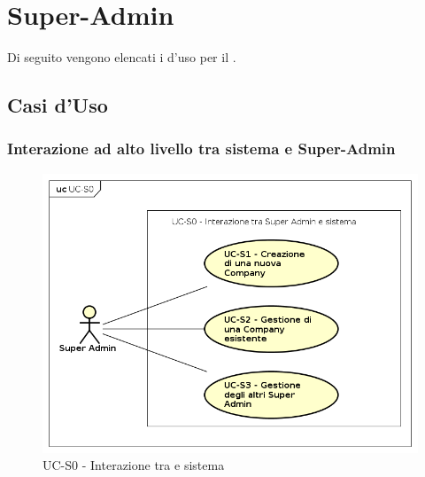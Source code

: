 \section{Super-Admin}

Di seguito vengono elencati i  d'uso per il .


\subsection{Casi d'Uso}

\subsubsection{Interazione ad alto livello tra sistema e Super-Admin}

    \begin{figure}[h]
      \begin{center}
        \includegraphics[width=12cm]{res/img/UCSuperadmin/UC-S0.png}
      \caption{UC-S0 - Interazione tra  e sistema}
      \end{center} 
    \end{figure}    
    
